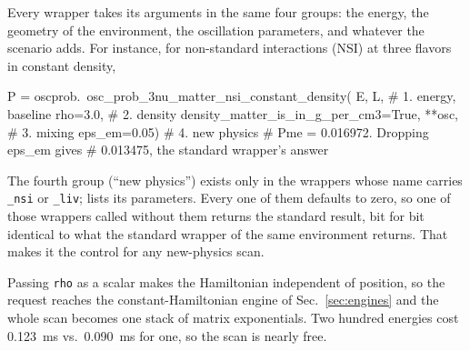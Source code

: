 Every wrapper takes its arguments in the same four groups: the energy, the geometry of the environment, the oscillation parameters, and whatever the scenario adds. For instance, for non-standard interactions (NSI) at three flavors in constant density,
\begin{pysnip}
P = oscprob.\
 osc_prob_3nu_matter_nsi_constant_density(
    E, L,            # 1. energy, baseline
    rho=3.0,         # 2. density
    density_matter_is_in_g_per_cm3=True,
    **osc,           # 3. mixing
    eps_em=0.05)     # 4. new physics
# Pme = 0.016972.  Dropping eps_em gives
# 0.013475, the standard wrapper's answer
\end{pysnip}
The fourth group (``new physics'') exists only in the wrappers whose name carries {\tt \_nsi} or {\tt \_liv};  lists its parameters. Every one of them defaults to zero, so one of those wrappers called without them returns the standard result, bit for bit identical to what the standard wrapper of the same environment returns. That makes it the control for any new-physics scan. 

Passing {\tt rho} as a scalar makes the Hamiltonian independent of position, so the request reaches the constant-Hamiltonian engine of Sec.~\ref{sec:engines} and the whole scan becomes one stack of matrix exponentials. Two hundred energies cost 0.123~ms vs.~0.090~ms for one, so the scan is nearly free.

